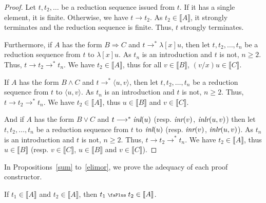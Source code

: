 \documentclass[screen, sigconf,authorversion,nonacm]{acmart}
\theoremstyle{acmdefinition}
\numberwithin{equation}{section}
\newcommand\abstr[1]{[#1]}
\newcommand\inl{\mbox{\it inl}}
\newcommand\inr{\mbox{\it inr}}
\newcommand\inlr{\mbox{\it inlr}}
\newcommand\plus{\mathrel{\text{\normalfont\scalebox{0.7}{\faPlus}}}}
\newcommand\pair[2]{\langle #1, #2 \rangle}
\begin{document}
\begin{proof}
Let $t, t_2, \ldots$ be a reduction sequence issued from $t$. If it has a
single element, it is finite. Otherwise, we have $t \longrightarrow
t_2$. As $t_2 \in \llbracket A \rrbracket$, it strongly terminates and
the reduction sequence is finite. Thus, $t$ strongly terminates.

Furthermore, if $A$ has the form $B \Rightarrow C$ and $t
\longrightarrow^* \lambda \abstr{x}u$, then let $t , t_2, \ldots, t_n$ be a
reduction sequence from $t$ to $\lambda \abstr{x}u$.  As $t_n$ is an
introduction and $t$ is not, $n \geq 2$. Thus, $t \longrightarrow t_2
\longrightarrow^* t_n$. We have $t_2 \in \llbracket A \rrbracket$,
thus for all $v \in \llbracket B \rrbracket$, $(v/x)u \in \llbracket C
\rrbracket$.

If $A$ has the form $B \wedge C$ and $t \longrightarrow^* \pair{u}{v}$, then let $t , t_2, \ldots, t_n$ be a reduction sequence
from $t$ to $\pair{u}{v}$.  As $t_n$ is an introduction and
$t$ is not, $n \geq 2$. Thus, $t \longrightarrow t_2 \longrightarrow^*
t_n$. We have $t_2 \in \llbracket A \rrbracket$, thus $u \in
\llbracket B \rrbracket$ and $v \in \llbracket C \rrbracket$.

And if $A$ has the form $B \vee C$ and $t \longrightarrow^* 
\inl(u)$ (resp. $\inr(v)$, $\inlr(u,v)$)
then
let $t , t_2, \ldots, t_n$ be a reduction sequence from $t$ to 
$\inl(u)$ (resp. $\inr(v)$,  $\inlr(u,v)$).
As $t_n$ is an introduction and $t$ is not, $n \geq 2$. Thus, $t
\longrightarrow t_2 \longrightarrow^* t_n$. We have $t_2 \in
\llbracket A \rrbracket$, thus 
$u \in \llbracket B \rrbracket$ (resp. $v \in \llbracket C \rrbracket$, 
$u \in \llbracket B \rrbracket$ and $v \in \llbracket C \rrbracket$).
\qedhere
\end{proof}

In Propositions~\ref{sum} to~\ref{elimor}, we prove the adequacy of each proof constructor.

\begin{proposition}[Adequacy of $\plus$]
\label{sum}
If $t_1 \in \llbracket A \rrbracket$ and $t_2 \in \llbracket A
\rrbracket$, then $t_1 \plus t_2 \in \llbracket A \rrbracket$.
\end{proposition}
\end{document}
